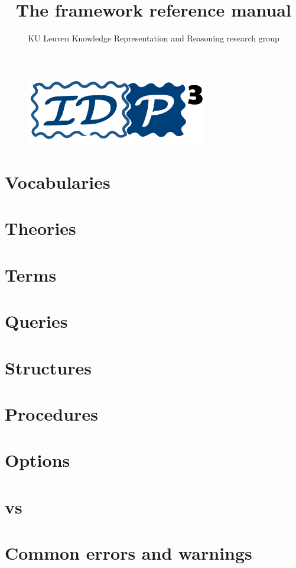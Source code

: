 \documentclass[a4]{article}
\title{The \idp framework reference manual}
\author{KU Leuven Knowledge Representation and Reasoning research group}
\begin{document}
\maketitle

\begin{figure}[!h]
\centering
\includegraphics[width=0.7\textwidth]{idp3logo}
\end{figure}

\newpage
\tableofcontents

\newpage










\section{Vocabularies}


\section{Theories}


\section{Terms}


\section{Queries}


\section{Structures}


\section{Procedures}


\section{Options}


\section{\idptwo vs \idpthree}


\section{Common errors and warnings}

\end{document}
